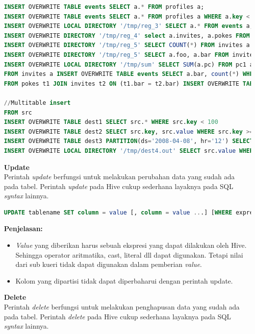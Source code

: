 \begin{lstlisting}[language=sql,basicstyle=\tiny,caption=Contoh DML Insert]
INSERT OVERWRITE TABLE events SELECT a.* FROM profiles a;
INSERT OVERWRITE TABLE events SELECT a.* FROM profiles a WHERE a.key < 100;
INSERT OVERWRITE LOCAL DIRECTORY '/tmp/reg_3' SELECT a.* FROM events a;
INSERT OVERWRITE DIRECTORY '/tmp/reg_4' select a.invites, a.pokes FROM profiles a;
INSERT OVERWRITE DIRECTORY '/tmp/reg_5' SELECT COUNT(*) FROM invites a WHERE a.ds='2008-08-15';
INSERT OVERWRITE DIRECTORY '/tmp/reg_5' SELECT a.foo, a.bar FROM invites a;
INSERT OVERWRITE LOCAL DIRECTORY '/tmp/sum' SELECT SUM(a.pc) FROM pc1 a;
FROM invites a INSERT OVERWRITE TABLE events SELECT a.bar, count(*) WHERE a.foo > 0 GROUP BY a.bar;
FROM pokes t1 JOIN invites t2 ON (t1.bar = t2.bar) INSERT OVERWRITE TABLE events SELECT t1.bar, t1.foo, t2.foo;

//Multitable insert
FROM src
INSERT OVERWRITE TABLE dest1 SELECT src.* WHERE src.key < 100
INSERT OVERWRITE TABLE dest2 SELECT src.key, src.value WHERE src.key >= 100 and src.key < 200
INSERT OVERWRITE TABLE dest3 PARTITION(ds='2008-04-08', hr='12') SELECT src.key WHERE src.key >= 200 and src.key < 300
INSERT OVERWRITE LOCAL DIRECTORY '/tmp/dest4.out' SELECT src.value WHERE src.key >= 300;
\end{lstlisting}


\textbf{Update}\\
Perintah \textit{update} berfungsi untuk melakukan perubahan data yang sudah ada pada tabel. Perintah \textit{update} pada Hive cukup sederhana layaknya pada SQL \textit{syntax} lainnya. 

\begin{lstlisting}[language=sql,basicstyle=\tiny,caption=Syntax DML Update]
UPDATE tablename SET column = value [, column = value ...] [WHERE expression]
\end{lstlisting}

\textbf{Penjelasan:}
\begin{itemize}
	\item \textit{Value} yang diberikan harus sebuah ekspresi yang dapat dilakukan oleh Hive. Sehingga operator aritmatika, cast, literal dll dapat digunakan. Tetapi nilai dari sub kueri tidak dapat digunakan dalam pemberian \textit{value}.
	\item Kolom yang dipartisi tidak dapat diperbaharui dengan perintah update.
\end{itemize}

\textbf{Delete}\\
Perintah \textit{delete} berfungsi untuk melakukan penghapusan data yang sudah ada pada tabel. Perintah \textit{delete} pada Hive cukup sederhana layaknya pada SQL \textit{syntax} lainnya. 

